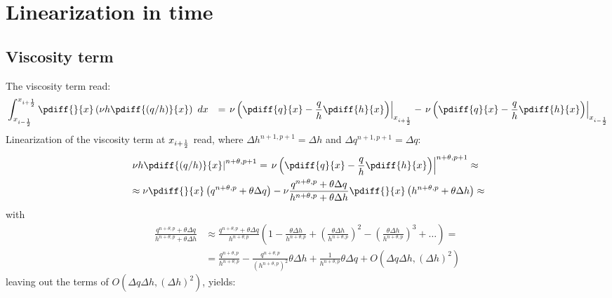 \chapter{Linearization in time}
\section{Viscosity term}\label{sec:linearisation_viscosity}
The viscosity term read:
\begin{align}
    &  \int^{x_{i+\half}}_{x_{i-\half}}\pdiff{}{x} \left( \nu h \pdiff{(q/h)}{x} \right)\ dx & =
    \left. \nu \left( \pdiff{q}{x} - \frac{q}{h} \pdiff{h}{x} \right) \right|_{x_{i+\half}} - \left. \nu \left( \pdiff{q}{x} - \frac{q}{h} \pdiff{h}{x} \right) \right|_{x_{i-\half}}
\end{align}
Linearization of the viscosity term at $x_{i+\frac{1}{2}}$ read, where $\Delta h^{n+1, p+1} = \Delta h$ and  $\Delta q^{n+1, p+1} = \Delta q$:
\begin{align}
    &\left. \nu h \pdiff{(q/h)}{x} \right|^{n+\theta, p+1}  = \left. \nu \left(\pdiff{q}{x} - \frac{q}{h} \pdiff{h}{x} \right) \right|^{n+\theta, p+1} \approx
    \\
    & \approx \nu \pdiff{}{x} \left( q^{n+\theta, p} + \theta \Delta q \right)
    - \nu \frac{q^{n+\theta, p} + \theta \Delta q}{h^{n+\theta, p} + \theta \Delta h} \pdiff{}{x} \left( h^{n+\theta, p} + \theta \Delta h  \right) \approx
\end{align}
with
\begin{align}
    \frac{q^{n+\theta, p} + \theta \Delta q}{h^{n+\theta, p} + \theta \Delta h}
    & \approx \frac{q^{n+\theta, p} + \theta \Delta q}{h^{n+\theta, p}}\left( 1 - \frac{\theta\Delta h}{h^{n+\theta, p}} +
    \left( \frac{\theta\Delta h}{h^{n+\theta, p}}  \right)^2 - \left( \frac{\theta\Delta h}{h^{n+\theta, p}}  \right)^3 + \ldots \right) =
    \\
    & =
    \frac{q^{n+\theta, p}}{h^{n+\theta, p}} - \frac{q^{n+\theta, p}}{(h^{n+\theta, p})^2}\theta\Delta h + \frac{1}{h^{n+\theta, p}}\theta \Delta q  + O\left( \Delta q\Delta h, \left(\Delta h\right)^2 \right)
\end{align}
leaving out the terms of $O\left( \Delta q\Delta h, \left(\Delta h\right)^2 \right)$, yields:
